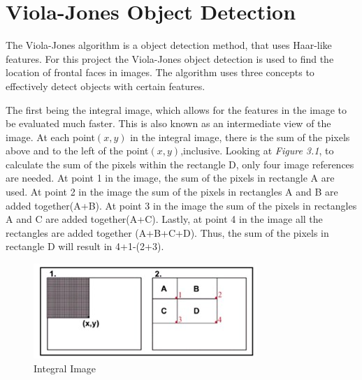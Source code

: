 \section{Viola-Jones Object Detection}
\begin{flushleft}
The Viola-Jones algorithm \citep{viola} is a object detection method, that uses Haar-like features. For this project the Viola-Jones object detection is used to find the location of frontal faces in images. The algorithm uses three concepts to effectively detect objects with certain features.

The first being the integral image, which allows for the features in the image to be evaluated much faster. This is also known as an intermediate view of the image. At each point$(x,y)$ in the integral image, there is the sum of the pixels above and to the left of the point$(x,y)$,inclusive. Looking at \textit{Figure 3.1}, to calculate the sum of the pixels within the rectangle D, only four image references are needed. At point 1 in the image, the sum of the pixels in rectangle A are used. At point 2 in the image the sum of the pixels in rectangles A and B are added together(A+B). At point 3 in the image the sum of the pixels in rectangles A and C are added together(A+C). Lastly, at point 4 in the image all the rectangles are added together (A+B+C+D). Thus, the sum of the pixels in rectangle D will result in 4+1-(2+3).
\end{flushleft}
\begin{figure}[H]
  \centering
  \includegraphics[scale=0.4]{1}
  \caption{Integral Image}
\end{figure}

